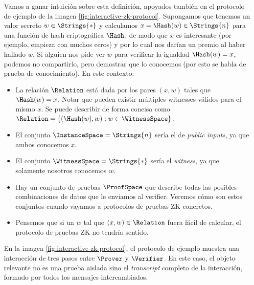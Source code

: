 Vamos a ganar intuición sobre esta definición, apoyados también en el protocolo de ejemplo de la imagen \ref{fig:interactive-zk-protocol}. Supongamos que tenemos un valor secreto $w \in \Strings{*}$ y calculamos $x = \Hash(w) \in \Strings{n}$ para una función de hash criptográfica $\Hash$, de modo que $x$ es interesante (por ejemplo, empieza con muchos ceros) y por lo cual nos darían un premio al haber hallado $w$. Si alguien nos pide ver $w$ para verificar la igualdad $\Hash(w) = x$, podemos no compartirlo, pero demostrar que lo conocemos (por esto se habla de prueba de conocimiento). En este contexto:

\begin{itemize}[noitemsep]
	\item La relación $\Relation$ está dada por los pares $(x,w)$ tales que $\Hash(w) = x$. Notar que pueden existir múltiples witnesses válidos para el mismo $x$. Se puede describir de forma concisa como $\Relation = \{(\Hash(w), w): w \in \WitnessSpace\}$.
	\item El conjunto $\InstanceSpace = \Strings{n}$ sería el de \textit{public inputs}, ya que ambos conocemos $x$.
	\item El conjunto $\WitnessSpace = \Strings{*}$ sería el \textit{witness}, ya que solamente nosotros conocemos $w$.
	\item Hay un conjunto de pruebas $\ProofSpace$ que describe todas las posibles combinaciones de datos que le enviamos al verifier. Veremos cómo son estos conjuntos cuando vayamos a protocolos de pruebas ZK concretos.
	\item Pensemos que si un $w$ tal que $(x,w) \in \Relation$ fuera fácil de calcular, el protocolo de pruebas ZK no tendría sentido.
\end{itemize}

En la imagen \ref{fig:interactive-zk-protocol}, el protocolo de ejemplo muestra una interacción de tres pasos entre $\Prover$ y $\Verifier$. En este caso, el objeto relevante no es una prueba aislada sino el \textit{transcript} completo de la interacción, formado por todos los mensajes intercambiados.

